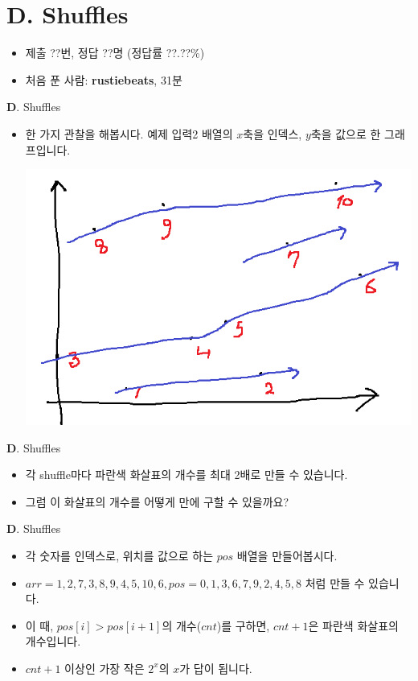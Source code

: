 \section{D. Shuffles}

\begin{frame} %
    \begin{itemize}
        \item 제출 ??번, 정답 ??명 (정답률 ??.??\%)
        \item 처음 푼 사람: \textbf{rustiebeats}, 31분
    \end{itemize}
\end{frame}

\begin{frame}{\textbf{D}. Shuffles}
    \begin{itemize}
        \item 한 가지 관찰을 해봅시다. 예제 입력2 배열의 $x$축을 인덱스, $y$축을 값으로 한 그래프입니다.
        \begin{center}
            \includegraphics[width=0.6\linewidth]{../images/shuffles.png}
        \end{center}
    \end{itemize}
\end{frame}

\begin{frame}{\textbf{D}. Shuffles}
    \begin{itemize}
        \item 각 shuffle마다 파란색 화살표의 개수를 최대 2배로 만들 수 있습니다.
        \item 그럼 이 화살표의 개수를 어떻게 만에 구할 수 있을까요?
    \end{itemize}
\end{frame}

\begin{frame}{\textbf{D}. Shuffles}
    \begin{itemize}
        \item 각 숫자를 인덱스로, 위치를 값으로 하는 $pos$ 배열을 만들어봅시다.
        \item $arr = 1,2,7,3,8,9,4,5,10,6, pos = 0,1,3,6,7,9,2,4,5,8$ 처럼 만들 수 있습니다.
        \item 이 때, $pos[i] > pos[i+1]$의 개수($cnt$)를 구하면, $cnt+1$은 파란색 화살표의 개수입니다.
        \item $cnt+1$ 이상인 가장 작은 $2^x$의 $x$가 답이 됩니다.
    \end{itemize}
\end{frame}